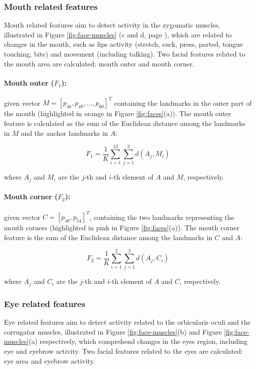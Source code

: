 \subsubsection{Mouth related features}

Mouth related features aim to detect activity in the zygomatic muscles, illustrated in Figure \ref{fig:face-muscles} (c and d, page \pageref{fig:face-muscles}), which are related to changes in the mouth, such as lips activity (stretch, suck, press, parted, tongue touching, bite) and movement (including talking). Two facial features related to the mouth area are calculated: mouth outer and mouth corner.

\paragraph{Mouth outer ($F_1$):} given vector $M = [p_{48}, p_{49}, \dots, p_{60}]^T$ containing the landmarks in the outer part of the mouth (highlighted in orange in Figure \ref{fig:faces}(a)). The mouth outer feature is calculated as the sum of the Euclidean distance among the landmarks in $M$ and the anchor landmarks in $A$:

\[
F_1 = \frac{1}{K} \sum_{i=1}^{12} \sum_{j=1}^{3} d(A_j, M_i)
\]

where $A_j$ and $M_i$ are the $j$-th and $i$-th element of $A$ and $M$, respectively.

\paragraph{Mouth corner ($F_2$):} given vector $C = [p_{48}, p_{54}]^T$, containing the two landmarks representing the mouth corners (highlighted in pink in Figure \ref{fig:faces}(a)). The mouth corner feature is the sum of the Euclidean distance among the landmarks in $C$ and $A$:

\[
F_2 = \frac{1}{K} \sum_{i=1}^{2} \sum_{j=1}^{3} d(A_j, C_i)
\]

where $A_j$ and $C_i$ are the $j$-th and $i$-th element of $A$ and $C$, respectively.

\subsubsection{Eye related features}

Eye related features aim to detect activity related to the orbicularis oculi and the corrugator muscles, illustrated in Figure \ref{fig:face-muscles}(b) and Figure \ref{fig:face-muscles}(a) respectively, which comprehend changes in the eyes region, including eye and eyebrow activity. Two facial features related to the eyes are calculated: eye area and eyebrow activity.

